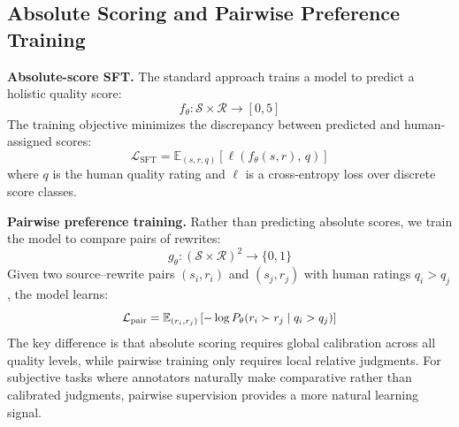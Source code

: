 \documentclass[11pt]{article}
\begin{document}
\subsection{Absolute Scoring and Pairwise Preference Training}
\label{sec:training}

\textbf{Absolute-score SFT.}
The standard approach trains a model to predict a holistic quality score:
\begin{equation}
    f_{\theta}: \mathcal{S} \times \mathcal{R} \rightarrow [0, 5]
    \label{eq:absolute}
\end{equation}
The training objective minimizes the discrepancy between predicted and human-assigned scores:
\begin{equation}
    \mathcal{L}_{\text{SFT}} = \mathbb{E}_{(s,r,q)} \left[ \ell(f_\theta(s,r),\, q) \right]
    \label{eq:sft_loss}
\end{equation}
where $q$ is the human quality rating and $\ell$ is a cross-entropy loss over discrete score classes.

\textbf{Pairwise preference training.}
Rather than predicting absolute scores, we train the model to compare pairs of rewrites:
\begin{equation}
    g_{\theta}: (\mathcal{S} \times \mathcal{R})^2 \rightarrow \{0, 1\}
    \label{eq:pairwise}
\end{equation}
Given two source--rewrite pairs $(s_i, r_i)$ and $(s_j, r_j)$ with human ratings $q_i > q_j$, the model learns:
\begin{equation}
\scalebox{0.95}{$
    \mathcal{L}_{\text{pair}} = \mathbb{E}_{(r_i, r_j)} \left[ -\log P_\theta(r_i \succ r_j \mid q_i > q_j) \right]
    \label{eq:pair_loss}
$}
\end{equation}
The key difference is that absolute scoring requires global calibration across all quality levels, while pairwise training only requires local relative judgments.
For subjective tasks where annotators naturally make comparative rather than calibrated judgments, pairwise supervision provides a more natural learning signal.
\end{document}

